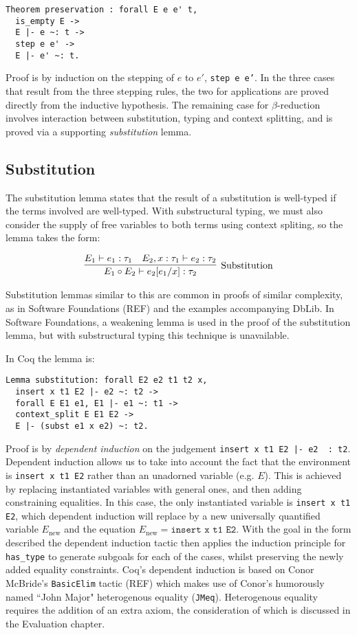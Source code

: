 \documentclass[]{unswthesis}
\newcommand{\types}{\vdash}
\let\c\texttt
\let\i\textit
\begin{document}
\begin{verbatim}
Theorem preservation : forall E e e' t,
  is_empty E ->
  E |- e ~: t ->
  step e e' ->
  E |- e' ~: t.
\end{verbatim}

Proof is by induction on the stepping of $e$ to $e'$, \c{step e e'}. In the three cases that result from the three stepping rules, the two for applications are proved directly from the inductive hypothesis. The remaining case for $\beta$-reduction involves interaction between substitution, typing and context splitting, and is proved via a supporting \i{substitution} lemma.

\subsection{Substitution}

The substitution lemma states that the result of a substitution is well-typed if the terms involved are well-typed. With substructural typing, we must also consider the supply of free variables to both terms using context spliting, so the lemma takes the form:

\begin{eqnarray*}
\infer[\text{Substitution}]{
    E_1 \circ E_2 \types e_2 [e_1/x] : \tau_2
}{
    E_1 \types e_1 : \tau_1 \quad E_2, x : \tau_1 \types e_2 : \tau_2
}
\end{eqnarray*}

Substitution lemmas similar to this are common in proofs of similar complexity, as in Software Foundations (REF) and the examples accompanying DbLib. In Software Foundations, a weakening lemma is used in the proof of the substitution lemma, but with substructural typing this technique is unavailable.

In Coq the lemma is:

\begin{verbatim}
Lemma substitution: forall E2 e2 t1 t2 x,
  insert x t1 E2 |- e2 ~: t2 ->
  forall E E1 e1, E1 |- e1 ~: t1 ->
  context_split E E1 E2 ->
  E |- (subst e1 x e2) ~: t2.
\end{verbatim}

Proof is by \i{dependent induction} on the judgement \c{insert x t1 E2 |- e2 ~: t2}. Dependent induction allows us to take into account the fact that the environment is \c{insert x t1 E2} rather than an unadorned variable (e.g. $E$). This is achieved by replacing instantiated variables with general ones, and then adding constraining equalities. In this case, the only instantiated variable is \c{insert x t1 E2}, which dependent induction will replace by a new universally quantified variable $E_\text{new}$ and the equation $E_\text{new} = \c{insert x t1 E2}$. With the goal in the form described the dependent induction tactic then applies the induction principle for \c{has_type} to generate subgoals for each of the cases, whilst preserving the newly added equality constraints. Coq's dependent induction is based on Conor McBride's \c{BasicElim} tactic (REF) which makes use of Conor's humorously named ``John Major" heterogenous equality (\c{JMeq}). Heterogenous equality requires the addition of an extra axiom, the consideration of which is discussed in the Evaluation chapter.
\end{document}
